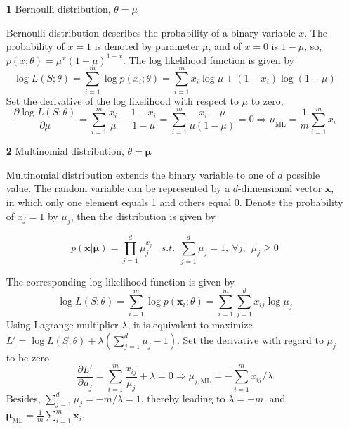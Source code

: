 \documentclass{article}
\begin{document}
	\begin{itemize}
	\item [\textbf{1}] Bernoulli distribution, $\theta={\mu}$
	
	Bernoulli distribution describes the probability of a binary variable $x$. The probability of $x=1$ is denoted by parameter $\mu$, and of $x=0$ is $1-\mu$, so, $p(x;\theta)=\mu^x(1-\mu)^{1-x}$. The log likelihood function is given by
	\begin{equation*}
	\log L(S;\theta) = \sum_{i=1}^m \log p(x_i;\theta) = \sum_{i=1}^m x_i\log \mu + (1-x_i)\log(1-\mu)
	\end{equation*}
Set the derivative of the log likelihood with respect to $\mu$ to zero,
	\begin{equation*}
	\frac{\partial \log L(S;\theta)}{\partial \mu} = \sum_{i=1}^m \frac{x_i}{\mu} - \frac{1-x_i}{1-\mu} = \sum_{i=1}^m \frac{x_i-\mu}{\mu(1-\mu)} = 0 \Longrightarrow	 \mu_{\mathrm{ML}}=\frac{1}{m}\sum_{i=1}^m x_i	
	\end{equation*}
	
	\item [\textbf{2}] Multinomial distribution, $\theta=\bm{\mu}$
	
	Multinomial distribution extends the binary variable to one of $d$ possible value. The random variable can be represented by a $d$-dimensional vector $\bm{x}$, in which only one element equals 1 and others equal 0. Denote the probability of $x_j=1$ by $\mu_j$, then the distribution is given by
	
	\begin{equation*}
	p(\bm{x}|\bm{\mu}) = \prod_{j=1}^d \mu_j^{x_j}\ \ \ \ \mathit{s.t.}\ \ \sum_{j=1}^d \mu_j=1,\ \forall j,\ \ \mu_j\geq 0
	\end{equation*}

	The corresponding log likelihood function is given by
	\begin{equation*}
	\log L(S;\theta) = \sum_{i=1}^m \log p(\bm{x}_i;\theta) = \sum_{i=1}^m \sum_{j=1}^d x_{ij} \log \mu_j
	\end{equation*}
Using Lagrange multiplier $\lambda$, it is equivalent to maximize  $L' = \log L(S;\theta) + \lambda \left( \sum_{j=1}^d \mu_j - 1 \right) $. Set the derivative with regard to  $\mu_j$ to be zero
	\begin{equation*}
	\frac{\partial L'}{\partial \mu_j} = \sum_{i=1}^m\frac{x_{ij}}{\mu_j} + \lambda = 0  \Longrightarrow	 \mu_{j,\mathrm{ML}} = -\sum_{i=1}^m x_{ij}/\lambda
	\end{equation*}
Besides, $\sum_{j=1}^d \mu_j=-m/\lambda=1$, thereby leading to $\lambda=-m$, and $\bm{\mu}_{\mathrm{ML}} = \frac{1}{m}\sum_{i=1}^m \bm{x}_i$.
	

\end{itemize}
\end{document}
